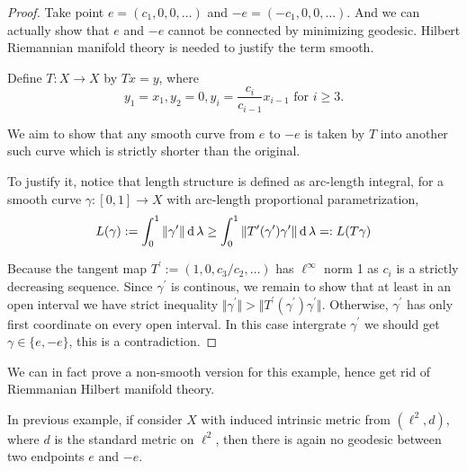 \begin{proof}

	Take point $e=(c_1, 0,0,\ldots)$ and $-e=(-c_1, 0,0,\ldots)$. And we can actually show that $e$ and $-e$ cannot be connected by minimizing geodesic. Hilbert Riemannian manifold  theory is needed to justify the term smooth.

	Define \( T: X \rightarrow X \) by \( T x = y \), where
	\[
		y _ { 1 } = x _ { 1 } , y _ { 2 } = 0 , y _ { i } = \frac{c_i}{c_{i-1}} x_{i-1} \text { for } i \geq 3 . \]

	We aim to show that any smooth curve from \( e\) to \( -e \) is taken by \( T \) into another such curve which is strictly shorter than the original.

	To justify it, notice that length structure is defined as arc-length integral, for a smooth curve $\gamma: [0,1] \rightarrow X$ with arc-length proportional parametrization,
	\[
		L(\gamma) := \int_{0}^{1} \Vert \gamma^\prime \Vert \operatorname{d} \lambda \geq \int_{0}^{1} \Vert T^\prime(\gamma^\prime) \gamma^\prime \Vert \operatorname{d} \lambda =: L(T\gamma)
	\]

	Because the tangent map $T^\prime := (1,0,{c_3}/{c_2}, \ldots)$ has $\ell^\infty$ norm 1 as $c_i$ is a strictly decreasing sequence. Since $\gamma^\prime$ is continous, we remain to show that at least in an open interval we have strict inequality $\Vert \gamma^\prime \Vert > \Vert T^\prime(\gamma^\prime) \gamma^\prime \Vert$. Otherwise, $\gamma^\prime$ has only first coordinate on every open interval. In this case intergrate $\gamma^\prime$ we should get $\gamma \in \{ e, -e\}$, this is a contradiction.
\end{proof}

We can in fact prove a non-smooth version for this example, hence get rid of Riemmanian Hilbert manifold theory.

\begin{lem}
	In previous example, if consider $X$ with induced intrinsic metric from $(\ell^2, d)$, where $d$ is the standard metric on $\ell^2$, then there is again no geodesic between two endpoints $e$ and $-e$.
\end{lem}

